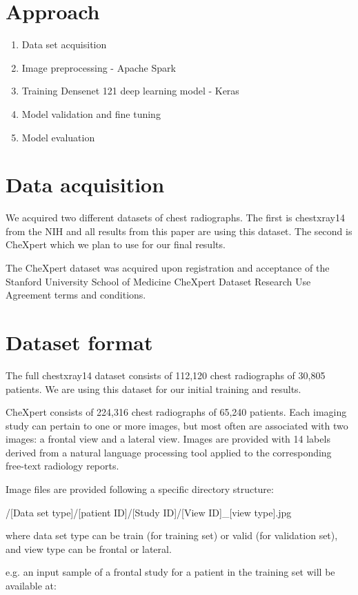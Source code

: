 \documentclass{amia}
\begin{document}
\section*{Approach}
\begin{enumerate}
\item Data set acquisition
\item Image preprocessing - Apache Spark
\item Training Densenet 121 deep learning model - Keras
\item Model validation and fine tuning
\item Model evaluation
\end{enumerate}

\section*{Data acquisition}
We acquired two different datasets of chest radiographs. The first is chestxray14 from the NIH and all results from this paper are using this dataset. The second is CheXpert which we plan to use for our final results.

The CheXpert dataset was acquired upon registration and acceptance of the Stanford University School of Medicine CheXpert Dataset Research Use Agreement terms and conditions.\cite{ref2}

\section*{Dataset format}
The full chestxray14 dataset consists of 112,120 chest radiographs of 30,805 patients. We are using this dataset for our initial training and results.

CheXpert consists of 224,316 chest radiographs of 65,240 patients. Each imaging study can pertain to one or more images, but most often are associated with two images: a frontal view and a lateral view. Images are provided with 14 labels derived from a natural language processing tool applied to the corresponding free-text radiology reports.

Image files are provided following a specific directory structure:

/[Data set type]/[patient ID]/[Study ID]/[View ID]\_[view type].jpg

where data set type can be train (for training set) or valid (for validation set), and view type can be frontal or lateral.

e.g. an input sample of a frontal study for a patient in the training set will be available at:
\end{document}
